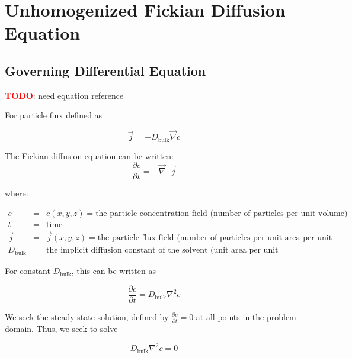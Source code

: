 
\section{Unhomogenized Fickian Diffusion Equation}\label{sec:unhom_fick}

\subsection{Governing Differential Equation}\label{subsec:unhom_fick_gov}

\textcolor{red}{\textbf{TODO}}: need equation reference


For particle flux defined as 

\begin{equation}
  \vec{j} = - D_{\mathrm{bulk}} \vec{\nabla} c
\end{equation}

The Fickian diffusion equation can be written:
\begin{equation}
  \frac{\partial c}{\partial t} = - \vec{\nabla} \cdot \vec{j}
\end{equation}

where:

$\begin{array}{rcl}
c & = & c(x,y,z) = \text{the particle concentration field (number of particles per unit volume)} \\
t & = & \text{time} \\
\vec{j} & = & \vec{j}(x,y,z) = \text{the particle flux field (number of particles per unit area per unit time)} \\
D_{\mathrm{bulk}} & = & \text{the implicit diffusion constant of the solvent (unit area per unit time)}
\end{array}$

For constant $D_{\mathrm{bulk}}$, this can be written as

\begin{equation}
  \frac{\partial c}{\partial t} = D_{\mathrm{bulk}} \nabla^2 c
\end{equation}

We seek the steady-state solution, defined by
  $\frac{\partial c}{\partial t} = 0$ at all points in the problem domain.
Thus, we seek to solve

\begin{equation}
  D_{\mathrm{bulk}} \nabla^2 c = 0
\end{equation}

